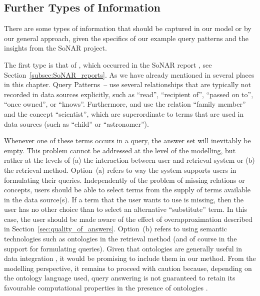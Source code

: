\subsection{Further Types of Information}
\label{subsec:further_information}

There are some types of information that should be captured in our model
or by our general approach,
given the specifics of our example query patterns
and the insights from the SoNAR project.

The first type is that of , which occurred
in the SoNAR report \autocite{Fangerau2022}, see Section~\ref{subsec:SoNAR_reports}.
As we have already mentioned in several places in this chapter.
Query Patterns~-- use several relationships
that are typically not recorded in data sources explicitly, such as
\enquote{read}, \enquote{recipient of}, \enquote{passed on to},
\enquote{once owned}, or \enquote{knows}.
Furthermore,  and 
use the relation \enquote{family member} and the concept \enquote{scientist},
which are superordinate to terms that are used in data sources
(such as \enquote{child} or \enquote{astronomer}).

Whenever one of these terms occurs in a query,
the answer set will inevitably be empty.
This problem cannot be addressed at the level of the modelling,
but rather at the levels of (a) the interaction between user and retrieval system
or (b) the retrieval method.
Option~(a) refers to way the system supports users in formulating their queries.
Independently of the problem of missing relations or concepts, users should be able to 
select terms from the supply of terms available in the data source(s).
If a term that the user wants to use is missing, then the user has no other choice than
to select an alternative \enquote{substitute} term.
In this case, the user should be made aware of the effect of overapproximation
described in Section~\ref{sec:quality_of_answers}.
Option~(b) refers to using semantic technologies such as ontologies
in the retrieval method (and of course in the support for formulating queries).
Given that ontologies are generally useful in data integration \autocite[§12]{Doan2012},
it would be promising to include them in our method.
From the modelling perspective, it remains to proceed with caution
because, depending on the ontology language used,
query answering is not guaranteed to retain its favourable computational properties
in the presence of ontologies \autocite{Xiao2018}.


